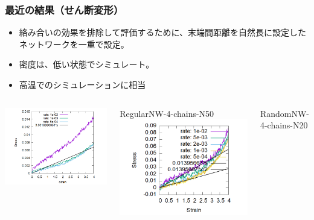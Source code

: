 \documentclass[11pt, dvipdfmx]{beamer}
\begin{document}
    \begin{frame}
        \frametitle{最近の結果（せん断変形）}
		\begin{itemize}
			\item 絡み合いの効果を排除して評価するために、末端間距離を自然長に設定したネットワークを一重で設定。
			\item 密度は、低い状態でシミュレート。
			\item 高温でのシミュレーションに相当
		\end{itemize}
		
        \begin{columns}[totalwidth=1\textwidth]
        \includegraphics[width=\textwidth]{./fig/reg_4_SS_multi.png}
        
		RegularNW-4-chains-N50
        \includegraphics[width=\textwidth]{./fig/random-4chain-SS_multi.png}

		RandomNW-4-chains-N20
        \end{columns}
        \end{frame}
\end{document}
